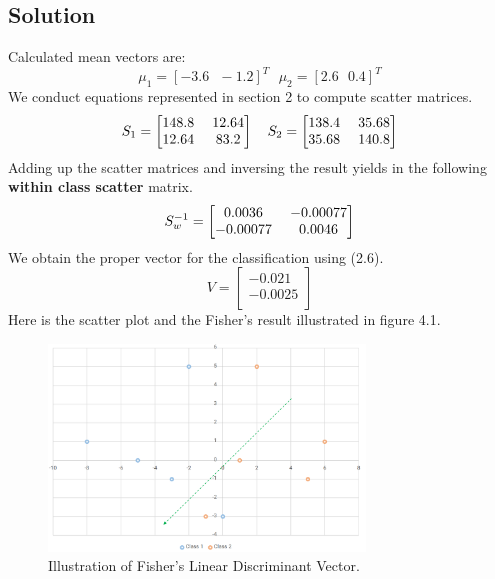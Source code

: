 \documentclass[12pt]{article}
\numberwithin{equation}{section}
\numberwithin{table}{section}
\numberwithin{figure}{section}
\begin{document}
\subsection*{Solution}
Calculated mean vectors are:
$$
	\mu_1  = [-3.6\ \ \ -1.2]^T \ \ \ \mu_2 = [2.6 \ \ \ 0.4]^T
$$
We conduct equations represented in section 2 to compute scatter matrices.
$$
\renewcommand\arraystretch{1}
\setlength\arraycolsep{6.5pt}
	S_1 = \begin{bmatrix}
	148.8 & 12.64\\
	12.64 & 83.2\\
	\end{bmatrix} \ \ \ S_2 = \begin{bmatrix}
	138.4 & 35.68\\
	35.68 & 140.8\\
	\end{bmatrix}
$$
Adding up the scatter matrices and inversing the result yields in the following \textbf{within class scatter} matrix.
$$
\renewcommand\arraystretch{1}
\setlength\arraycolsep{6.5pt}
	S_w^{-1} = \begin{bmatrix}
	0.0036 & -0.00077\\
	-0.00077 & 0.0046\\
	\end{bmatrix}
$$
We obtain the proper vector for the classification using (2.6).
$$
	V = \begin{bmatrix}
	-0.021\\
	-0.0025\\
	\end{bmatrix}
$$
Here is the scatter plot and the Fisher's result illustrated in figure 4.1.
\begin{figure}[!h]\centering
	\includegraphics[width=0.75\textwidth]{5_1.PNG}
	\caption{Illustration of Fisher's Linear Discriminant Vector.}
	\label{pl1}
\end{figure}
\end{document}
